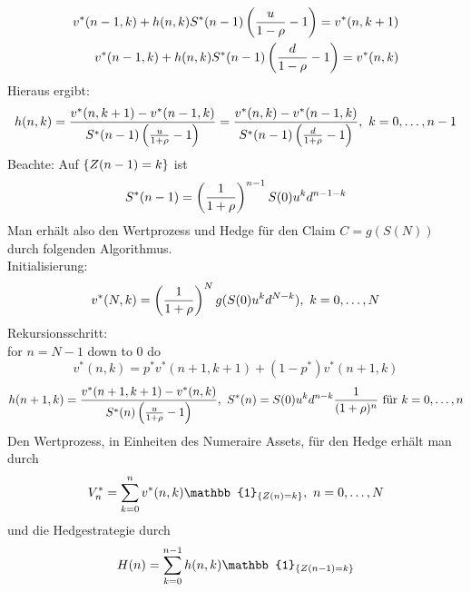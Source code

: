 \begin{equation*}
\begin{aligned}
	v^*(n-1,k)+h(n,k)S^*(n-1)\left( \frac{u}{1-\rho}-1\right)=v^*(n,k+1)\\
	v^*(n-1,k)+h(n,k)S^*(n-1)\left( \frac{d}{1-\rho}-1\right)=v^*(n,k)	
\end{aligned}
\end{equation*}
Hieraus ergibt:
\begin{equation*}
\begin{aligned}
	h(n,k)=\frac{v^*(n,k+1)-v^*(n-1,k)}{S^*(n-1)\left( \frac{u}{1+\rho}-1\right)}=\frac{v^*(n,k)-v^*(n-1,k)}{S^*(n-1)\left( \frac{d}{1+\rho}-1\right)},~k=0, \dots ,n-1
\end{aligned}
\end{equation*}
Beachte: Auf $\left\{Z(n-1)=k\right\}$ ist
\[
S^*(n-1)=\left( \frac{1}{1+\rho}\right)^{n-1}S(0)u^kd^{n-1-k}
\]
Man erhält also den Wertprozess und Hedge für den Claim $C=g(S(N))$ durch folgenden Algorithmus.\\
Initialisierung:
\[
v^*(N,k)=\left( \frac{1}{1+\rho}\right)^Ng(S(0)u^kd^{N-k}),~k=0, \dots ,N
\]
Rekursionsschritt:\\
for $n=N-1$ down to 0 do
\[
v^*(n,k)=p^*v^*(n+1,k+1)+(1-p^*)v^*(n+1,k)
\]
\[
h(n+1,k)=\frac{v^*(n+1,k+1)-v^*(n,k)}{S^*(n)\left( \frac{u}{1+\rho}-1\right)},~S^*(n)=S(0)u^kd^{n-k}\frac{1}{(1+\rho)^n}\text{ für }k=0, \dots ,n
\]
Den Wertprozess, in Einheiten des Numeraire Assets, für den Hedge erhält man durch
\[
V_n^*=\sum_{k=0}^{n}v^*(n,k)\mathbb{1}_{\penbrace{Z(n)=k}},~n=0\dt{,}N
\]
und die Hedgestrategie durch
\[
H(n)=\sum_{k=0}^{n-1}h(n,k)\mathbb{1}_{\penbrace{Z(n-1)=k}}
\]


